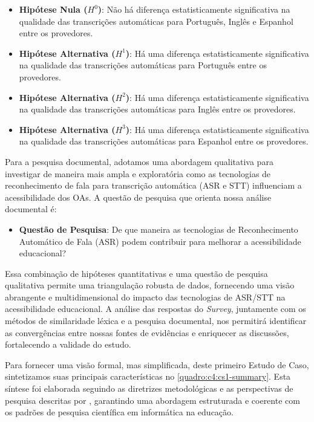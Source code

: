 \begin{itemize}
\item \textbf{Hipótese Nula ($H^0$)}: Não há diferença estatisticamente significativa na qualidade das transcrições automáticas para Português, Inglês e Espanhol entre os provedores.
\item \textbf{Hipótese Alternativa ($H^1$)}: Há uma diferença estatisticamente significativa na qualidade das transcrições automáticas para Português entre os provedores.
\item \textbf{Hipótese Alternativa ($H^2$)}: Há uma diferença estatisticamente significativa na qualidade das transcrições automáticas para Inglês entre os provedores.
\item \textbf{Hipótese Alternativa ($H^3$)}: Há uma diferença estatisticamente significativa na qualidade das transcrições automáticas para Espanhol entre os provedores.
\end{itemize}

Para a pesquisa documental, adotamos uma abordagem qualitativa para investigar de maneira mais ampla e exploratória como as tecnologias de reconhecimento de fala para transcrição automática (ASR e STT) influenciam a acessibilidade dos OAs. A questão de pesquisa que orienta nossa análise documental é:

\begin{itemize}
\item \textbf{Questão de Pesquisa}: De que maneira as tecnologias de Reconhecimento Automático de Fala (ASR) podem contribuir para melhorar a acessibilidade educacional?
\end{itemize}

Essa combinação de hipóteses quantitativas e uma questão de pesquisa qualitativa permite uma triangulação robusta de dados, fornecendo uma visão abrangente e multidimensional do impacto das tecnologias de ASR/STT na acessibilidade educacional. A análise das respostas do \textit{Survey}, juntamente com os métodos de similaridade léxica e a pesquisa documental, nos permitirá identificar as convergências entre nossas fontes de evidências e enriquecer as discussões, fortalecendo a validade do estudo.

Para fornecer uma visão formal, mas simplificada, deste primeiro Estudo de Caso, sintetizamos suas principais características no \autoref{quadro:c4:cs1-summary}. Esta síntese foi elaborada seguindo as diretrizes metodológicas e as perspectivas de pesquisa descritas por , garantindo uma abordagem estruturada e coerente com os padrões de pesquisa científica em informática na educação.

